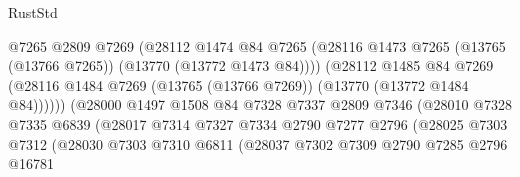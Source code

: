 \begin{lexlean}{RustStd}
\begin{coremodule}
                                      @7265
                                      @2809
                                      @7269
                                      (@28112
                                        @1474
                                        @84
                                        @7265
                                        (@28116
                                          @1473
                                          @7265
                                          (@13765 (@13766 @7265))
                                          (@13770 (@13772 @1473 @84))))
                                      (@28112
                                        @1485
                                        @84
                                        @7269
                                        (@28116
                                          @1484
                                          @7269
                                          (@13765 (@13766 @7269))
                                          (@13770 (@13772 @1484 @84))))))
                                  (@28000
                                    @1497
                                    @1508
                                    @84
                                    @7328
                                    @7337
                                    @2809
                                    @7346
                                    (@28010
                                      @7328
                                      @7335
                                      @6839
                                      (@28017
                                        @7314
                                        @7327
                                        @7334
                                        @2790
                                        @7277
                                        @2796
                                        (@28025
                                          @7303
                                          @7312
                                          (@28030
                                            @7303
                                            @7310
                                            @6811
                                            (@28037
                                              @7302
                                              @7309
                                              @2790
                                              @7285
                                              @2796
                                              @16781

\end{coremodule}
\end{lexlean}
